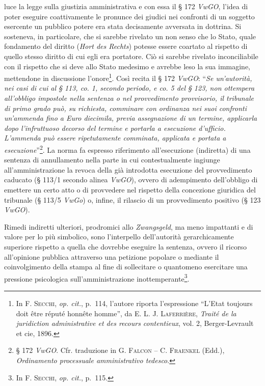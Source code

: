 \documentclass[12pt,it,a4paper,]{report}
\begin{document}
luce la legge sulla giustizia amministrativa e con essa il § 172
\emph{VwGO}, l'idea di poter eseguire coattivamente le pronunce dei
giudici nei confronti di un soggetto esercente un pubblico potere era
stata decisamente avversata in dottrina. Si sosteneva, in particolare,
che si sarebbe rivelato un non senso che lo Stato, quale fondamento del
diritto (\emph{Hort des Rechts}) potesse essere coartato al rispetto di
quello stesso diritto di cui egli era portatore. Ciò si sarebbe rivelato
inconciliabile con il rispetto che si deve allo Stato medesimo e avrebbe
leso la sua immagine, mettendone in discussione l'onore\footnote{In
  \textsc{F. Secchi}, \emph{op. cit.}, p.~114, l'autore riporta
  l'espressione ``L'Etat toujours doit être réputé honnête homme'', da
  E. L. J. \textsc{Laferrière}, \emph{Traité de la juridiction
  administrative et des recours contentieux}, vol. 2, Berger-Levrault et
  cie, 1896.}. Così recita il § 172 \emph{VwGO}: ``\emph{Se un'autorità,
nei casi di cui al § 113, co. 1, secondo periodo, e co. 5 del § 123, non
ottempera all'obbligo impostole nella sentenza o nel provvedimento
provvisorio, il tribunale di primo grado può, su richiesta, comminare
con ordinanza nei suoi confronti un'ammenda fino a Euro diecimila,
previa assegnazione di un termine, applicarla dopo l'infruttuoso decorso
del termine e portarla a esecuzione d'ufficio. L'ammenda può essere
ripetutamente comminata, applicata e portata a esecuzione}''\footnote{§
  172 \emph{VwGO}. Cfr. traduzione in G. \textsc{Falcon} -- C.
  \textsc{Fraenkel} (Edd.), \emph{Ordinamento processuale amministrativo
  tedesco}.}. La norma fa espresso riferimento all'esecuzione
(indiretta) di una sentenza di annullamento nella parte in cui
contestualmente ingiunge all'amministrazione la revoca della già
introdotta esecuzione del provvedimento caducato (§ 113/1 secondo alinea
\emph{VwGO}), ovvero di adempimento dell'obbligo di emettere un certo
atto o di provvedere nel rispetto della concezione giuridica del
tribunale (§ 113/5 \emph{VwGo}) o, infine, il rilascio di un
provvedimento positivo (§ 123 \emph{VwGO}).

Rimedi indiretti ulteriori, prodromici allo \emph{Zwangsgeld}, ma meno
impattanti e di valore per lo più simbolico, sono l'interpello
dell'autorità gerarchicamente superiore rispetto a quella che dovrebbe
eseguire la sentenza, ovvero il ricorso all'opinione pubblica attraverso
una petizione popolare o mediante il coinvolgimento della stampa al fine
di sollecitare o quantomeno esercitare una pressione psicologica
sull'amministrazione inottemperante\footnote{In \textsc{F. Secchi},
  \emph{op. cit.}, p.~115.}.
\end{document}
